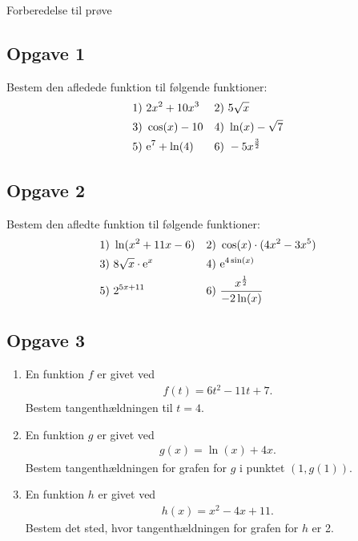 \begin{center}
\Huge
	Forberedelse til prøve
\end{center}

\subsection*{Opgave 1}
Bestem den afledede funktion til følgende funktioner:
\begin{align*}
	&1) \ 2x^2 + 10x^3 &&2) \ 5\sqrt{x} \\
	&3) \ \cos(x)-10 &&4) \ \ln(x)-\sqrt{7} \\
	&5) \ \textnormal{e}^{7}+\ln(4) &&6) \ -5x^{\frac{3}{2}} \\
\end{align*}

\subsection*{Opgave 2}
Bestem den afledte funktion til følgende funktioner:
\begin{align*}
	&1) \ \ln(x^2+11x-6) &&2) \ \cos(x)\cdot(4x^2-3x^5) \\
	&3) \  8\sqrt{x}\cdot \textnormal{e}^{x} &&4) \ \textnormal{e}^{4\sin(x)}\\
	&5) \ 2^{5x+11} &&6) \ \frac{x^{\frac{1}{2}}}{-2\ln(x)} \\
\end{align*}

\newpage

\subsection*{Opgave 3}

\begin{enumerate}[label=\roman*)]
	\item En funktion $f$ er givet ved
	\begin{align*}
		f(t) = 6t^2-11t+7.
	\end{align*}
	Bestem tangenthældningen til $t = 4$.
	\item En funktion $g$ er givet ved
	\begin{align*}
		g(x) = \ln(x)+4x.
	\end{align*}
	Bestem tangenthældningen for grafen for $g$ i punktet $(1,g(1))$.
	\item En funktion $h$ er givet ved
	\begin{align*}
		h(x) = x^2-4x+11.
	\end{align*}
	Bestem det sted, hvor tangenthældningen for grafen for $h$ er 2.
	
\end{enumerate}

